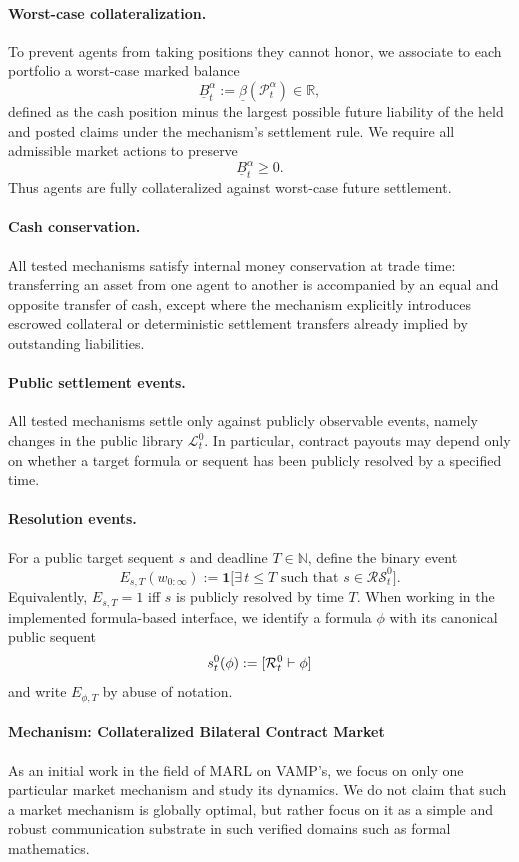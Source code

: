 \paragraph{Worst-case collateralization.}
To prevent agents from taking positions they cannot honor, we associate to each portfolio a worst-case marked balance
\[
\underline B^\alpha_t := \underline\beta(\mathcal P^\alpha_t)\in\mathbb R,
\]
defined as the cash position minus the largest possible future liability of the held and posted claims under the mechanism's settlement rule. We require all admissible market actions to preserve
\[
\underline B^\alpha_t \ge 0.
\]
Thus agents are fully collateralized against worst-case future settlement.

\paragraph{Cash conservation.}
All tested mechanisms satisfy internal money conservation at trade time: transferring an asset from one agent to another is accompanied by an equal and opposite transfer of cash, except where the mechanism explicitly introduces escrowed collateral or deterministic settlement transfers already implied by outstanding liabilities.

\paragraph{Public settlement events.}
All tested mechanisms settle only against publicly observable events, namely changes in the public library $\mathcal L^0_t$. In particular, contract payouts may depend only on whether a target formula or sequent has been publicly resolved by a specified time.


\paragraph{Resolution events.}
For a public target sequent $s$ and deadline $T\in\mathbb N$, define the binary event
\[
E_{s,T}(w_{0:\infty}) := \mathbf 1\big[\exists\, t\le T \text{ such that } s\in \mathcal{RS}^0_t\big].
\]
Equivalently, $E_{s,T}=1$ iff $s$ is publicly resolved by time $T$.
When working in the implemented formula-based interface, we identify a formula $\phi$ with its canonical public sequent
\[
s^0_t(\phi):=[\mathcal R^0_t\vdash \phi]
\]
and write $E_{\phi,T}$ by abuse of notation.



\paragraph{Mechanism: Collateralized Bilateral Contract Market}
As an initial work in the field of MARL on VAMP's, we focus on only one particular market mechanism and study its dynamics. We do not claim that such a market mechanism is globally optimal, but rather focus on it as a simple and robust communication substrate in such verified domains such as formal mathematics.

